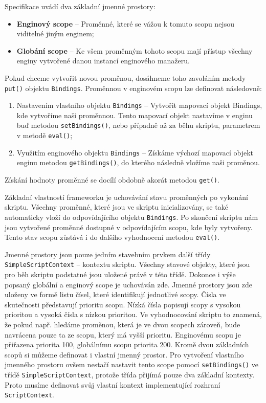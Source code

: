 \bigskip \noindent Specifikace uvádí dva základní jmenné prostory:

\begin{itemize}
  \item \textbf{Enginový scope} -- Proměnné, které se vážou k tomuto scopu nejsou viditelné jiným enginem;
  \item \textbf{Globání scope} -- Ke všem proměnným tohoto scopu mají přístup všechny enginy vytvořené danou instancí enginového manažeru.
\end{itemize}

Pokud chceme vytvořit novou proměnou, dosáhneme toho zavoláním metody \texttt{put()} objektu \texttt{Bindings}. Proměnnou v enginovém scopu lze definovat následovně:

\begin{enumerate}
  \item Nastavením vlastního objektu \texttt{Bindings} -- Vytvořit mapovací objekt Bindings, kde vytvoříme naši proměnnou. Tento mapovací objekt nastavíme v enginu buď metodou \texttt{setBindings()}, nebo případně až za běhu skriptu, parametrem v metodě \texttt{eval()};
  \item Využitím enginového objektu \texttt{Bindings} -- Získáme výchozí mapovací objekt enginu metodou \texttt{getBindings()}, do kterého následně vložíme naši proměnou.
\end{enumerate}

Získání hodnoty proměnné se docílí obdobně akorát metodou \texttt{get()}.

Základní vlastností frameworku je uchovávání stavu proměnných po vykonání skriptu. Všechny proměnné, které jsou ve skriptu inicializovány, se také automaticky vloží do odpovídajícího objektu \texttt{Bindings}. Po skončení skriptu nám jsou vytvořené proměnné dostupné v odpovídajícím scopu, kde byly vytvořeny. Tento stav scopu zůstává i do dalšího vyhodnocení metodou \texttt{eval()}.

Jmenné prostory jsou pouze jedním stavebním prvkem další třídy \texttt{SimpleScriptContext} -- kontextu skriptu. Všechny stavové objekty, které jsou pro běh skriptu podstatné jsou uložené právě v této třídě. Dokonce i výše popsaný globální a enginový scope je uchováván zde. Jmenné prostory jsou zde uloženy ve formě listu čísel, které identifikují jednotlivé scopy. Čísla ve skutečnosti představují prioritu scopu. Nízká čísla popisují scopy s vysokou prioritou a vysoká čísla s nízkou prioritou. Ve vyhodnocování skriptu to znamená, že pokud např. hledáme proměnou, která je ve dvou scopech zároveň, bude navrácena pouze ta ze scopu, který má vyšší prioritu. Enginovému scopu je přiřazena priorita 100, globálnímu scopu priorita 200. Kromě dvou základních scopů si můžeme definovat i vlastní jmenný prostor. Pro vytvoření vlastního jmenného prostoru ovšem nestačí nastavit tento scope pomocí \texttt{setBindings()} ve třídě \texttt{SimpleScriptContext}, protože třída přijímá pouze dva základní kontexty. Proto musíme definovat svůj vlastní kontext implementující rozhraní \texttt{ScriptContext}.

